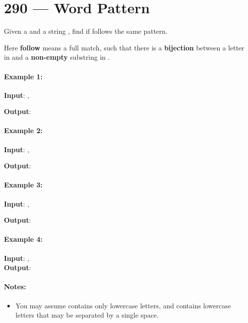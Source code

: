 \section{290 --- Word Pattern}
Given a  and a string , find if  follows the same pattern.

Here \textbf{follow} means a full match, such that there is a \textbf{bijection} between a letter in  and a \textbf{non-empty} substring in .
\paragraph{Example 1:}
\begin{flushleft}
\textbf{Input}: , 

\textbf{Output}: 
\end{flushleft}

\paragraph{Example 2:}
\begin{flushleft}
\textbf{Input}: , 

\textbf{Output}: 
\end{flushleft}

\paragraph{Example 3:}
\begin{flushleft}
\textbf{Input}: , 

\textbf{Output}: 
\end{flushleft}

\paragraph{Example 4:}
\begin{flushleft}
\textbf{Input}: , 
\\
\textbf{Output}: 
\end{flushleft}

\paragraph{Notes:}
\begin{itemize}
\item You may assume  contains only lowercase letters, and  contains lowercase letters that may be separated by a single space.
\end{itemize}
